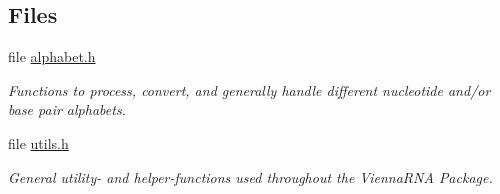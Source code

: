 \subsection*{Files}
\begin{DoxyCompactItemize}
\item 
file \hyperlink{alphabet_8h}{alphabet.\+h}
\begin{DoxyCompactList}\small\item\em Functions to process, convert, and generally handle different nucleotide and/or base pair alphabets. \end{DoxyCompactList}\item 
file \hyperlink{utils_8h}{utils.\+h}
\begin{DoxyCompactList}\small\item\em General utility-\/ and helper-\/functions used throughout the {\itshape Vienna\+R\+N\+A} {\itshape Package}. \end{DoxyCompactList}\end{DoxyCompactItemize}
